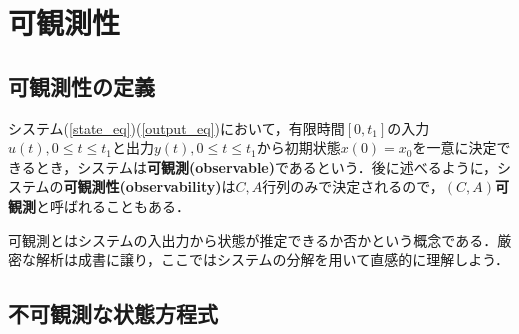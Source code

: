 \section{可観測性}

\subsection{可観測性の定義}

システム(\ref{state_eq})(\ref{output_eq})において，有限時間$[0,t_1]$の入力$u(t),0 \leq t \leq t_1$と出力$y(t), 0 \leq t \leq t_1$から初期状態$x(0)=x_0$を一意に決定できるとき，システムは{\bf 可観測(observable)}であるという．後に述べるように，システムの{\bf 可観測性(observability)}は$C,A$行列のみで決定されるので，{\bf $(C,A)$可観測}と呼ばれることもある．

可観測とはシステムの入出力から状態が推定できるか否かという概念である．厳密な解析は成書に譲り，ここではシステムの分解を用いて直感的に理解しよう．

\subsection{不可観測な状態方程式}


